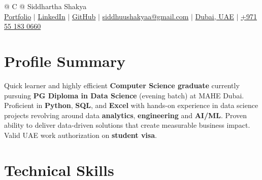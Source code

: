 \documentclass[a4paper,10.5pt]{article}
\begin{document}
\pagestyle{empty} 


\begin{tabularx}{\linewidth}{@{} C @{}}
\fontsize{26pt}{30pt}\selectfont Siddhartha Shakya \\[5pt]
\href{https://siddhushkya.github.io/my-portfolio/}{Portfolio} $|$ 
\href{https://www.linkedin.com/in/sidshkya/}{LinkedIn} $|$ 
\href{https://github.com/SiddhuShkya}{GitHub} $|$ 
\href{mailto:siddhuushakyaa@gmail.com}{siddhuushakyaa@gmail.com} $|$ 
\href{https://www.google.com/maps/place/International+City,+Morocco+1/@25.204338,55.270563,17z/data=!3m1!4b1!4m5!3m4!1s0x3e5f43c8f8f8f8f8:0x3e5f43c8f8f8f8f8!8m2!3d25.204338!4d55.270563}{Dubai, UAE} $|$ 
\href{tel:+971551830660}{+971 55 183 0660} \\
\end{tabularx}

\section{Profile Summary}

\vspace{5pt}

Quick learner and highly efficient \textbf{Computer Science graduate} currently pursuing 
\textbf{PG Diploma in Data Science} (evening batch) at MAHE Dubai. Proficient in \textbf{Python}, 
\textbf{SQL}, and \textbf{Excel} with hands-on experience in data science projects revolving around 
data \textbf{analytics}, \textbf{engineering} and \textbf{AI/ML}. Proven ability to deliver data-driven solutions that create 
measurable business impact. Valid UAE work authorization on \textbf{student visa}.

\section{Technical Skills}
\end{document}
